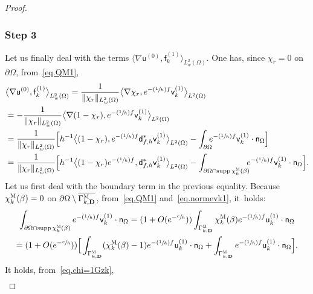 \documentclass[JEP,XML,SOM,Unicode,NoEqCountersInSection,NoFloatCountersInSection,published]{cedram}
\newcommand{\Psfrac}[2]{(\sfrac{#1}{#2})}
\newcommand{\mbf}[1]{\mathbf{#1}}
\let\lp\langle
\let\rp\rangle
\DeclareMathOperator\supp{supp}
\theoremstyle{plain}
\theoremstyle{definition}
\begin{document}
\begin{proof}
\subsubsection*{Step 3} Let us finally deal with the terms $
\big \lp \nabla\mathsf u^{(0)}, \mathsf f_k^{(1)}\big\rp_{L^2_w(\Omega)}$.
One has, since $\chi_r=0$ on $\partial \Omega$, from~\eqref{eq.QM1},
\begin{align*}
& \big \lp \nabla \mathsf u^{(0)}, \mathsf f_k^{(1)}\big\rp_{L^2_w(\Omega)}= \frac{1}{\Vert \chi_r\Vert_{L^2_w(\Omega)}} \big \lp \nabla \chi_r, e^{-\Psfrac 1hf} \mathsf v_k^{(1)}\big\rp_{L^2(\Omega)}\\
&=-\frac{1}{\Vert \chi_r\Vert_{L^2_w(\Omega)}} \big \lp \nabla(1- \chi_r), e^{-\Psfrac 1hf} \mathsf v_k^{(1)}\big\rp_{L^2(\Omega)}\\
&= \frac{1}{\Vert \chi_r\Vert_{L^2_w(\Omega)}} \Big[ h^{-1} \big \lp (1- \chi_r), e^{-\Psfrac 1hf}\mathsf d^*_{f,h} \mathsf v_k^{(1)}\big\rp_{L^2(\Omega)} -\int_{\partial \Omega}\hspace*{-2mm} e^{-\Psfrac 1hf} \mathsf v_k^{(1)} \cdot \mathsf n_\Omega \Big]\\
&= \frac{1}{\Vert \chi_r\Vert_{L^2_w(\Omega)}} \Big[ h^{-1} \big \lp (1- \chi_r) e^{-\Psfrac 1hf}, \mathsf d^*_{f,h} \mathsf v_k^{(1)}\big\rp_{L^2(\Omega)} -\int_{\partial \Omega \cap\supp \chi_k^{\textsc{M}} (\beta) }\hspace*{-2mm} e^{-\Psfrac 1hf} \mathsf v_k^{(1)} \cdot \mathsf n_\Omega \Big].
\end{align*}
Let us first deal with the boundary term in the previous equality.
Because $\chi_k^{\textsc{M}} (\beta)=\nobreak0$ on $\partial \Omega\setminus \overline{\Gamma_{k,\mbf D}^{ \textsc{M} }}$, from~\eqref{eq.QM1} and~\eqref{eq.normevk1}, it~holds:
\begin{multline*}
\int_{\partial \Omega \cap\supp \chi_k^{\textsc{M}} (\beta) } e^{-\Psfrac 1hf} \mathsf v_k^{(1)} \cdot \mathsf n_\Omega = (1+O(e^{-\sfrac ch}))\int_{ \Gamma_{k,\mbf D}^{ \textsc{M} }} \chi_k^{\textsc{M}} (\beta) e^{-\Psfrac 1hf} \mathsf u_k^{(1)} \cdot \mathsf n_\Omega \\
= (1+O(e^{-\sfrac ch}))\Big[ \int_{ \Gamma_{k,\mbf D}^{ \textsc{M} }} (\chi_k^{\textsc{M}} (\beta)-1) e^{-\Psfrac 1hf} \mathsf u_k^{(1)} \cdot \mathsf n_\Omega + \int_{ \Gamma_{k,\mbf D}^{ \textsc{M} }} e^{-\Psfrac 1hf} \mathsf u_k^{(1)} \cdot \mathsf n_\Omega\Big].
\end{multline*}
It holds, from~\eqref{eq.chi=1Gzk},
\[
\begin{aligned}

\end{aligned}\]
\end{proof}
\end{document}
